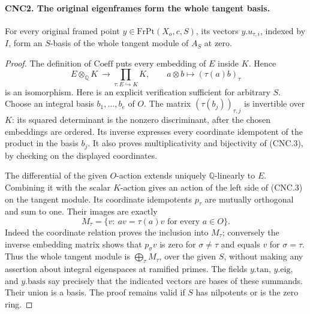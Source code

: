 \paragraph{CNC2. The original eigenframes form the whole tangent basis.}
\label{claim:CNC2}
For every original framed point \(y\in\mathrm{FrPt}(X_o,c,S)\), its
vectors \(y.u_{\tau,i}\), indexed by \(I\), form an \(S\)-basis of
the whole tangent module of \(A_S\) at zero.
\begin{proof}
The definition of \(\mathrm{Coeff}\) puts every embedding of \(E\)
inside \(K\).  Hence
\[
 E\otimes_{\mathbb Q}K\ \longrightarrow\prod_{\tau:E\hookrightarrow K}K,
       \qquad a\otimes b\longmapsto(\tau(a)b)_\tau             \tag{CNC.3}
\]
is an isomorphism.  Here is an explicit verification sufficient for
arbitrary \(S\).  Choose an integral basis \(b_1,\ldots,b_e\) of
\(O\).  The matrix \((\tau(b_j))_{\tau,j}\) is invertible over
\(K\): its squared determinant is the nonzero discriminant, after the
chosen embeddings are ordered.  Its inverse expresses every coordinate
idempotent of the product in the basis \(b_j\).  It also proves
multiplicativity and bijectivity of (CNC.3), by checking on the displayed
coordinates.

The differential of the given \(O\)-action extends uniquely
\(\mathbb Q\)-linearly to \(E\).  Combining it with the scalar
\(K\)-action gives an action of the left side of (CNC.3) on the tangent
module.  Its coordinate idempotents \(p_\tau\) are mutually orthogonal
and sum to one.  Their images are exactly
\[
 M_\tau=\{v:\ a v=\tau(a)v\text{ for every }a\in O\}.
\]
Indeed the coordinate relation proves the inclusion into \(M_\tau\);
conversely the inverse embedding matrix shows that \(p_\sigma v\)
is zero for \(\sigma\ne\tau\) and equals \(v\) for
\(\sigma=\tau\).  Thus the whole tangent module is
\(\bigoplus_\tau M_\tau\), over the given \(S\), without making
any assertion about integral eigenspaces at ramified primes.
The fields \(y.\mathrm{tan}\), \(y.\mathrm{eig}\), and
\(y.\mathrm{basis}\) say precisely that the indicated vectors are
bases of these summands.  Their union is a basis.  The proof remains
valid if \(S\) has nilpotents or is the zero ring.
\end{proof}


